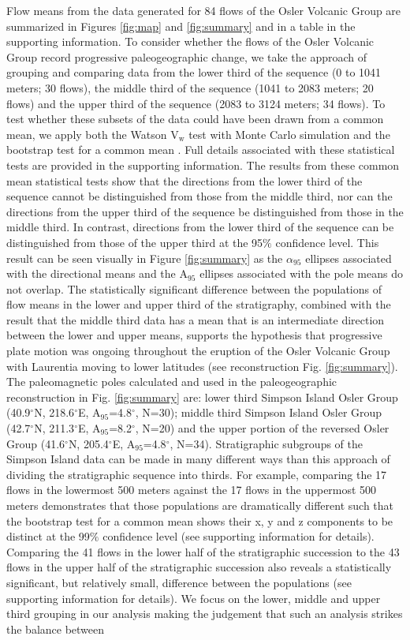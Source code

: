\documentclass[draft,gc]{AGUTeX}
\begin{document}
\begin{article}
Flow means from the data generated for 84 flows of the Osler Volcanic Group are summarized in Figures \ref{fig:map} and \ref{fig:summary} and in a table in the supporting information. To consider whether the flows of the Osler Volcanic Group record progressive paleogeographic change, we take the approach of grouping and comparing data from the lower third of the sequence (0 to 1041 meters; 30 flows), the middle third of the sequence (1041 to 2083 meters; 20 flows) and the upper third of the sequence (2083 to 3124 meters; 34 flows). To test whether these subsets of the data could have been drawn from a common mean, we apply both the Watson V$_{\mathrm w}$ test with Monte Carlo simulation \citep{Watson1983a} and the bootstrap test for a common mean \citep{Tauxe2010a}. Full details associated with these statistical tests are provided in the supporting information. The results from these common mean statistical tests show that the directions from the lower third of the sequence cannot be distinguished from those from the middle third, nor can the directions from the upper third of the sequence be distinguished from those in the middle third. In contrast, directions from the lower third of the sequence can be distinguished from those of the upper third at the 95$\%$ confidence level. This result can be seen visually in Figure \ref{fig:summary} as the $\alpha_{95}$ ellipses associated with the directional means and the A$_{95}$ ellipses associated with the pole means do not overlap. The statistically significant difference between the populations of flow means in the lower and upper third of the stratigraphy, combined with the result that the middle third data has a mean that is an intermediate direction between the lower and upper means, supports the hypothesis that progressive plate motion was ongoing throughout the eruption of the Osler Volcanic Group with Laurentia moving to lower latitudes (see reconstruction Fig. \ref{fig:summary}). The paleomagnetic poles calculated and used in the paleogeographic reconstruction in Fig. \ref{fig:summary} are: lower third Simpson Island Osler Group (40.9$^\circ$N, 218.6$^\circ$E, A$_{95}$=4.8$^\circ$, N=30); middle third Simpson Island Osler Group (42.7$^\circ$N, 211.3$^\circ$E, A$_{95}$=8.2$^\circ$, N=20)  and the upper portion of the reversed Osler Group (41.6$^\circ$N, 205.4$^\circ$E, A$_{95}$=4.8$^\circ$, N=34). Stratigraphic subgroups of the Simpson Island data can be made in many different ways than this approach of dividing the stratigraphic sequence into thirds. For example, comparing the 17 flows in the lowermost 500 meters against the 17 flows in the uppermost 500 meters demonstrates that those populations are dramatically different such that the bootstrap test for a common mean shows their x, y and z components to be distinct at the 99$\%$ confidence level (see supporting information for details). Comparing the 41 flows in the lower half of the stratigraphic succession to the 43 flows in the upper half of the stratigraphic succession also reveals a statistically significant, but relatively small, difference between the populations (see supporting information for details). We focus on the lower, middle and upper third grouping in our analysis making the judgement that such an analysis strikes the balance between 
\end{article}
\end{document}
